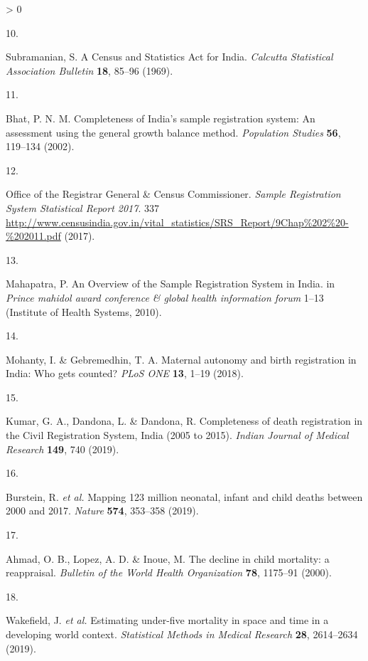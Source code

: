 \documentclass[
]{article}
\newlength{\cslhangindent}
\newlength{\csllabelwidth}
\newenvironment{CSLReferences}[2] %
 {%
  \setlength{\parindent}{0pt}
  \ifodd #1 \everypar{\setlength{\hangindent}{\cslhangindent}}\ignorespaces\fi
  \ifnum #2 > 0
  \setlength{\parskip}{#2\baselineskip}
  \fi
 }%
 {}
\newcommand{\CSLLeftMargin}[1]{\parbox[t]{\csllabelwidth}{#1}}
\newcommand{\CSLRightInline}[1]{\parbox[t]{\linewidth - \csllabelwidth}{#1}\break}
\begin{document}
\begin{CSLReferences}{0}{0}
\leavevmode\hypertarget{ref-Subramanian1969}{}%
\CSLLeftMargin{10. }
\CSLRightInline{Subramanian, S. {A Census and Statistics Act for India}. \emph{Calcutta Statistical Association Bulletin} \textbf{18}, 85--96 (1969).}

\leavevmode\hypertarget{ref-Bhat2002}{}%
\CSLLeftMargin{11. }
\CSLRightInline{Bhat, P. N. M. {Completeness of India's sample registration system: An assessment using the general growth balance method}. \emph{Population Studies} \textbf{56}, 119--134 (2002).}

\leavevmode\hypertarget{ref-CensusofIndia2017}{}%
\CSLLeftMargin{12. }
\CSLRightInline{Office of the Registrar General \& Census Commissioner. \emph{{Sample Registration System Statistical Report 2017}}. 337 \url{http://www.censusindia.gov.in/vital_statistics/SRS_Report/9Chap\%202\%20-\%202011.pdf} (2017).}

\leavevmode\hypertarget{ref-Mahapatra2010}{}%
\CSLLeftMargin{13. }
\CSLRightInline{Mahapatra, P. {An Overview of the Sample Registration System in India}. in \emph{Prince mahidol award conference \& global health information forum} 1--13 (Institute of Health Systems, 2010).}

\leavevmode\hypertarget{ref-Mohanty2018}{}%
\CSLLeftMargin{14. }
\CSLRightInline{Mohanty, I. \& Gebremedhin, T. A. {Maternal autonomy and birth registration in India: Who gets counted?} \emph{PLoS ONE} \textbf{13}, 1--19 (2018).}

\leavevmode\hypertarget{ref-Kumar2019}{}%
\CSLLeftMargin{15. }
\CSLRightInline{Kumar, G. A., Dandona, L. \& Dandona, R. {Completeness of death registration in the Civil Registration System, India (2005 to 2015)}. \emph{Indian Journal of Medical Research} \textbf{149}, 740 (2019).}

\leavevmode\hypertarget{ref-Burstein2019}{}%
\CSLLeftMargin{16. }
\CSLRightInline{Burstein, R. \emph{et al.} {Mapping 123 million neonatal, infant and child deaths between 2000 and 2017}. \emph{Nature} \textbf{574}, 353--358 (2019).}

\leavevmode\hypertarget{ref-Ahmad2000}{}%
\CSLLeftMargin{17. }
\CSLRightInline{Ahmad, O. B., Lopez, A. D. \& Inoue, M. {The decline in child mortality: a reappraisal.} \emph{Bulletin of the World Health Organization} \textbf{78}, 1175--91 (2000).}

\leavevmode\hypertarget{ref-Wakefield2019}{}%
\CSLLeftMargin{18. }
\CSLRightInline{Wakefield, J. \emph{et al.} {Estimating under-five mortality in space and time in a developing world context}. \emph{Statistical Methods in Medical Research} \textbf{28}, 2614--2634 (2019).}


\end{CSLReferences}
\end{document}
